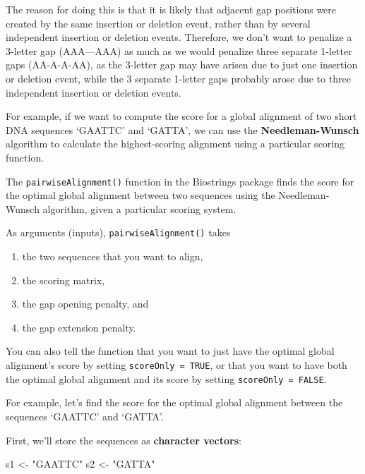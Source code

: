 \documentclass[
]{book}
\newenvironment{Shaded}{\begin{snugshade}}{\end{snugshade}}
\newcommand{\NormalTok}[1]{#1}
\newcommand{\OtherTok}[1]{\textcolor[rgb]{0.56,0.35,0.01}{#1}}
\newcommand{\StringTok}[1]{\textcolor[rgb]{0.31,0.60,0.02}{#1}}
\providecommand{\tightlist}{%
  \setlength{\itemsep}{0pt}\setlength{\parskip}{0pt}}
\begin{document}
The reason for doing this is that it is likely that adjacent gap positions were created by the same insertion or deletion event, rather than by several independent insertion or deletion events. Therefore, we don't want to penalize a 3-letter gap (AAA---AAA) as much as we would penalize three separate 1-letter gaps (AA-A-A-AA), as the 3-letter gap may have arisen due to just one insertion or deletion event, while the 3 separate 1-letter gaps probably arose due to three independent insertion or deletion events.

For example, if we want to compute the score for a global alignment of two short DNA sequences `GAATTC' and `GATTA', we can use the \textbf{Needleman-Wunsch} algorithm to calculate the highest-scoring alignment using a particular scoring function.

The \texttt{pairwiseAlignment()} function in the Biostrings package finds the score for the optimal global alignment between two sequences using the Needleman-Wunsch algorithm, given a particular scoring system.

As arguments (inputs), \texttt{pairwiseAlignment()} takes

\begin{enumerate}
\def\labelenumi{\arabic{enumi}.}
\tightlist
\item
  the two sequences that you want to align,
\item
  the scoring matrix,
\item
  the gap opening penalty, and
\item
  the gap extension penalty.
\end{enumerate}

You can also tell the function that you want to just have the optimal global alignment's score by setting \texttt{scoreOnly\ =\ TRUE}, or that you want to have both the optimal global alignment and its score by setting \texttt{scoreOnly\ =\ FALSE}.

For example, let's find the score for the optimal global alignment between the sequences `GAATTC' and `GATTA'.

First, we'll store the sequences as \textbf{character vectors}:

\begin{Shaded}
\begin{Highlighting}[]
\NormalTok{s1 }\OtherTok{\textless{}{-}} \StringTok{"GAATTC"}
\NormalTok{s2 }\OtherTok{\textless{}{-}} \StringTok{"GATTA"}
\end{Highlighting}
\end{Shaded}
\end{document}

